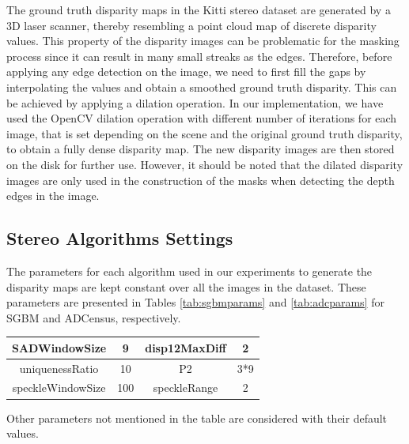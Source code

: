 The ground truth disparity maps in the Kitti stereo dataset are generated by a 3D laser scanner, thereby resembling
a point cloud map of discrete disparity values. This property of the disparity images 
can be problematic for the masking process since it can result in many small streaks as the edges.
Therefore, before applying any edge
detection on the image, we need to first fill the gaps by interpolating the values and obtain a smoothed ground truth disparity.
This can be achieved by applying a dilation operation.
In our implementation, we have used the OpenCV dilation operation with different number of iterations for each image, that is set depending on the scene 
and the original ground truth disparity, to obtain a fully dense disparity map. 
The new disparity images are then stored on the disk for further use.
However, it should be noted that the dilated disparity images are only used in the construction of the masks when detecting the depth
edges in the image.

\subsection{Stereo Algorithms Settings}
The parameters for each algorithm used in our experiments to generate the disparity
maps are kept constant over all the images in the dataset. These parameters are presented in Tables \ref{tab:sgbmparams} and \ref{tab:adcparams} 
for SGBM and ADCensus, respectively.

{\footnotesize
\begin{minipage}{\linewidth}
\begin{center}
\label{tab:sgbmparams}
\begin{tabular}{ |c|c|c|c|}
\hline
SADWindowSize & 9 & disp12MaxDiff & 2 \\ \hline
uniquenessRatio & 10 & P2 & 3*9 \\ \hline
speckleWindowSize & 100 & speckleRange & 2 \\ \hline
\end{tabular}
\end{center}
\end{minipage} \newline
}

Other parameters not mentioned in the table are considered with their default values.

